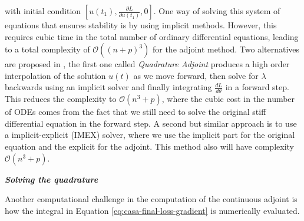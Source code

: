 with initial condition $[u(t_1), \frac{\partial L}{\partial u(t_1)}, 0]$. One way of solving this system of equations that ensures stability is by using implicit methods. However, this requires cubic time in the total number of ordinary differential equations, leading to a total complexity of $\mathcal O((n+p)^3)$ for the adjoint method. Two alternatives are proposed in \cite{kim_stiff_2021}, the first one called \textit{Quadrature Adjoint} produces a high order interpolation of the solution $u(t)$ as we move forward, then solve for $\lambda$ backwards using an implicit solver and finally integrating $\frac{dL}{d\theta}$ in a forward step. This reduces the complexity to $\mathcal O (n^3 + p)$, where the cubic cost in the number of ODEs comes from the fact that we still need to solve the original stiff differential equation in the forward step. A second but similar approach is to use a implicit-explicit (IMEX) solver, where we use the implicit part for the original equation and the explicit for the adjoint. This method also will have complexity $\mathcal O (n^3 + p)$.

\vspace*{10px}
\noindent \textbf{\textit{Solving the quadrature}}
\vspace*{5px}

Another computational challenge in the computation of the continuous adjoint is how the integral in Equation \eqref{eq:casa-final-loss-gradient} is numerically evaluated. 
